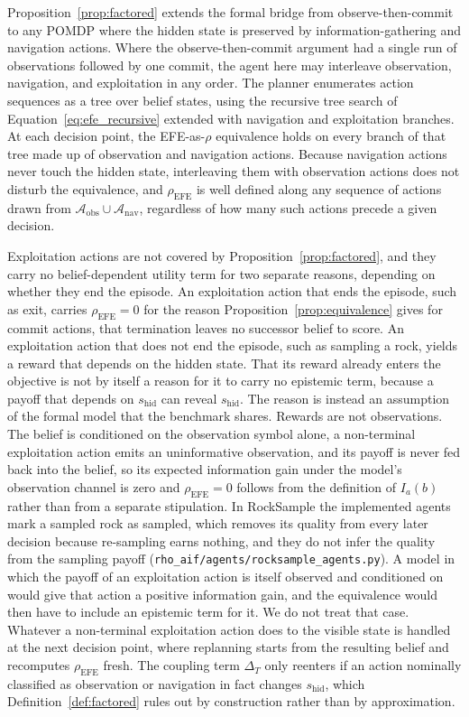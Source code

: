Proposition~\ref{prop:factored} extends the formal bridge from observe-then-commit to any POMDP where the hidden state is preserved by information-gathering and navigation actions. Where the observe-then-commit argument had a single run of observations followed by one commit, the agent here may interleave observation, navigation, and exploitation in any order. The planner enumerates action sequences as a tree over belief states, using the recursive tree search of Equation~\ref{eq:efe_recursive} extended with navigation and exploitation branches. At each decision point, the EFE-as-$\rho$ equivalence holds on every branch of that tree made up of observation and navigation actions. Because navigation actions never touch the hidden state, interleaving them with observation actions does not disturb the equivalence, and $\rho_{\mathrm{EFE}}$ is well defined along any sequence of actions drawn from $\mathcal{A}_{\mathrm{obs}} \cup \mathcal{A}_{\mathrm{nav}}$, regardless of how many such actions precede a given decision.

Exploitation actions are not covered by Proposition~\ref{prop:factored}, and they carry no belief-dependent utility term for two separate reasons, depending on whether they end the episode. An exploitation action that ends the episode, such as exit, carries $\rho_{\mathrm{EFE}} = 0$ for the reason Proposition~\ref{prop:equivalence} gives for commit actions, that termination leaves no successor belief to score. An exploitation action that does not end the episode, such as sampling a rock, yields a reward that depends on the hidden state. That its reward already enters the objective is not by itself a reason for it to carry no epistemic term, because a payoff that depends on $s_{\mathrm{hid}}$ can reveal $s_{\mathrm{hid}}$. The reason is instead an assumption of the formal model that the benchmark shares. Rewards are not observations. The belief is conditioned on the observation symbol alone, a non-terminal exploitation action emits an uninformative observation, and its payoff is never fed back into the belief, so its expected information gain under the model's observation channel is zero and $\rho_{\mathrm{EFE}} = 0$ follows from the definition of $I_a(b)$ rather than from a separate stipulation. In RockSample the implemented agents mark a sampled rock as sampled, which removes its quality from every later decision because re-sampling earns nothing, and they do not infer the quality from the sampling payoff (\texttt{rho\_\allowbreak aif/\allowbreak agents/\allowbreak rocksample\_\allowbreak agents.py}). A model in which the payoff of an exploitation action is itself observed and conditioned on would give that action a positive information gain, and the equivalence would then have to include an epistemic term for it. We do not treat that case. Whatever a non-terminal exploitation action does to the visible state is handled at the next decision point, where replanning starts from the resulting belief and recomputes $\rho_{\mathrm{EFE}}$ fresh. The coupling term $\Delta_T$ only reenters if an action nominally classified as observation or navigation in fact changes $s_{\mathrm{hid}}$, which Definition~\ref{def:factored} rules out by construction rather than by approximation.

